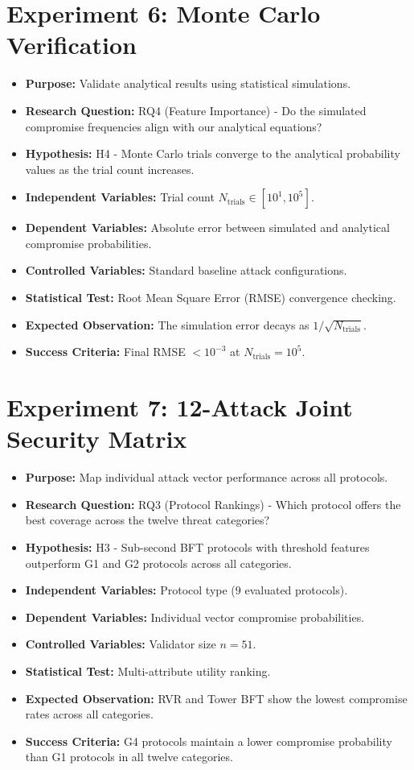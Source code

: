 \documentclass[12pt, oneside, a4paper]{report}
\theoremstyle{definition}
\theoremstyle{remark}
\begin{document}
\section{Experiment 6: Monte Carlo Verification}
\label{sec:ed:e6}
\begin{itemize}
  \item \textbf{Purpose:} Validate analytical results using statistical simulations.
  \item \textbf{Research Question:} RQ4 (Feature Importance) - Do the simulated compromise frequencies align with our analytical equations?
  \item \textbf{Hypothesis:} H4 - Monte Carlo trials converge to the analytical probability values as the trial count increases.
  \item \textbf{Independent Variables:} Trial count $N_{\mathrm{trials}} \in [10^1, 10^5]$.
  \item \textbf{Dependent Variables:} Absolute error between simulated and analytical compromise probabilities.
  \item \textbf{Controlled Variables:} Standard baseline attack configurations.
  \item \textbf{Statistical Test:} Root Mean Square Error (RMSE) convergence checking.
  \item \textbf{Expected Observation:} The simulation error decays as $1/\sqrt{N_{\mathrm{trials}}}$.
  \item \textbf{Success Criteria:} Final RMSE $< 10^{-3}$ at $N_{\mathrm{trials}} = 10^5$.
\end{itemize}

\section{Experiment 7: 12-Attack Joint Security Matrix}
\label{sec:ed:e7}
\begin{itemize}
  \item \textbf{Purpose:} Map individual attack vector performance across all protocols.
  \item \textbf{Research Question:} RQ3 (Protocol Rankings) - Which protocol offers the best coverage across the twelve threat categories?
  \item \textbf{Hypothesis:} H3 - Sub-second BFT protocols with threshold features outperform G1 and G2 protocols across all categories.
  \item \textbf{Independent Variables:} Protocol type (9 evaluated protocols).
  \item \textbf{Dependent Variables:} Individual vector compromise probabilities.
  \item \textbf{Controlled Variables:} Validator size $n=51$.
  \item \textbf{Statistical Test:} Multi-attribute utility ranking.
  \item \textbf{Expected Observation:} RVR and Tower BFT show the lowest compromise rates across all categories.
  \item \textbf{Success Criteria:} G4 protocols maintain a lower compromise probability than G1 protocols in all twelve categories.
\end{itemize}
\end{document}
